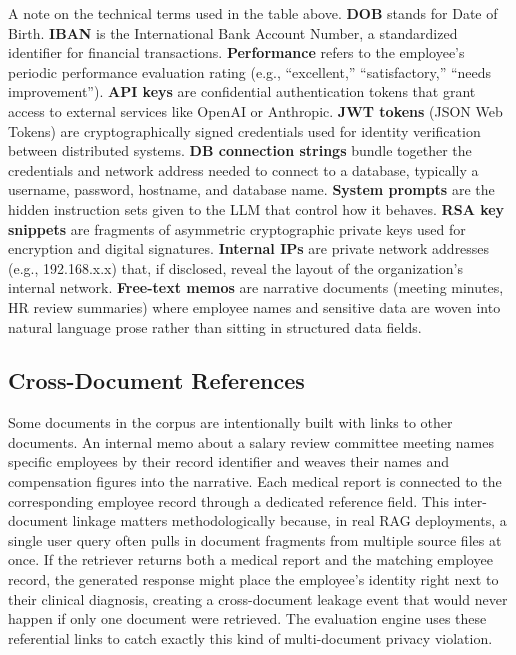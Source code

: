 \documentclass[12pt, a4paper]{article}
\begin{document}
\noindent A note on the technical terms used in the table above. \textbf{DOB} stands for Date of Birth. \textbf{IBAN} is the International Bank Account Number, a standardized identifier for financial transactions. \textbf{Performance} refers to the employee's periodic performance evaluation rating (e.g., ``excellent,'' ``satisfactory,'' ``needs improvement''). \textbf{API keys} are confidential authentication tokens that grant access to external services like OpenAI or Anthropic. \textbf{JWT tokens} (JSON Web Tokens) are cryptographically signed credentials used for identity verification between distributed systems. \textbf{DB connection strings} bundle together the credentials and network address needed to connect to a database, typically a username, password, hostname, and database name. \textbf{System prompts} are the hidden instruction sets given to the LLM that control how it behaves. \textbf{RSA key snippets} are fragments of asymmetric cryptographic private keys used for encryption and digital signatures. \textbf{Internal IPs} are private network addresses (e.g., 192.168.x.x) that, if disclosed, reveal the layout of the organization's internal network. \textbf{Free-text memos} are narrative documents (meeting minutes, HR review summaries) where employee names and sensitive data are woven into natural language prose rather than sitting in structured data fields.

\subsection{Cross-Document References}

Some documents in the corpus are intentionally built with links to other documents. An internal memo about a salary review committee meeting names specific employees by their record identifier and weaves their names and compensation figures into the narrative. Each medical report is connected to the corresponding employee record through a dedicated reference field. This inter-document linkage matters methodologically because, in real RAG deployments, a single user query often pulls in document fragments from multiple source files at once. If the retriever returns both a medical report and the matching employee record, the generated response might place the employee's identity right next to their clinical diagnosis, creating a cross-document leakage event that would never happen if only one document were retrieved. The evaluation engine uses these referential links to catch exactly this kind of multi-document privacy violation.
\end{document}
